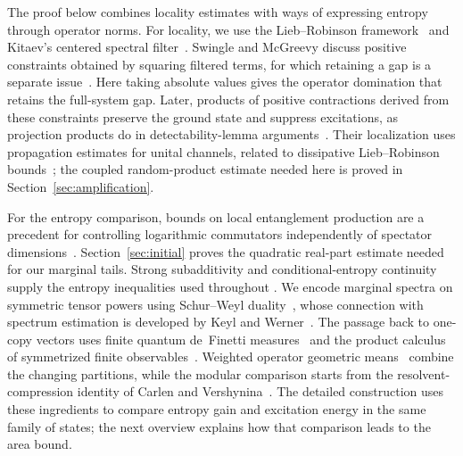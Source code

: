 The proof below combines locality estimates with ways of expressing entropy
through operator norms. For locality, we use the Lieb--Robinson
framework~\cite{LiebRobinson1972,NachtergaeleOgataSims2006} and Kitaev's
centered spectral filter~\cite[Appendix~D.1.2]{Kitaev2006Anyons}.
Swingle and McGreevy discuss positive constraints obtained by squaring
filtered terms, for which retaining a gap is a separate
issue~\cite[Section~8.4]{SwingleMcGreevy2016}. Here taking absolute
values gives the operator domination that retains the full-system gap.
Later, products of positive contractions derived from these constraints
preserve the ground state and suppress excitations, as projection products
do in detectability-lemma arguments~\cite{AnshuAradVidick2016}. Their localization uses propagation
estimates for unital channels, related to dissipative Lieb--Robinson
bounds~\cite{BarthelKliesch2012}; the coupled random-product estimate
needed here is proved in Section~\ref{sec:amplification}.

For the entropy comparison, bounds on local entanglement production are a
precedent for controlling logarithmic commutators independently of
spectator dimensions~\cite{VanAcoleyenMarienVerstraete2013}.
Section~\ref{sec:initial} proves the quadratic real-part estimate needed
for our marginal tails. Strong subadditivity and conditional-entropy
continuity supply the entropy inequalities used throughout
\cite{LiebRuskai1973,AlickiFannes2004,Winter2016}.
We encode marginal spectra on symmetric tensor powers using
Schur--Weyl duality~\cite{EtingofEtAl2011}, whose connection with spectrum
estimation is developed by Keyl and Werner~\cite{KeylWerner2001}.
The passage back to one-copy vectors uses finite quantum de~Finetti
measures~\cite{ChristandlEtAl2007,LewinNamRougerie2015} and the product
calculus of symmetrized finite observables~\cite{RaggioWerner1989}.
Weighted operator geometric means~\cite{PuszWoronowicz1975,KuboAndo1980}
combine the changing partitions, while the modular comparison starts
from the resolvent-compression identity of Carlen and
Vershynina~\cite[Lemma~2.1]{CarlenVershynina2019}.
The detailed construction uses these ingredients to compare entropy gain
and excitation energy in the same family of states; the next overview
explains how that comparison leads to the area bound.
